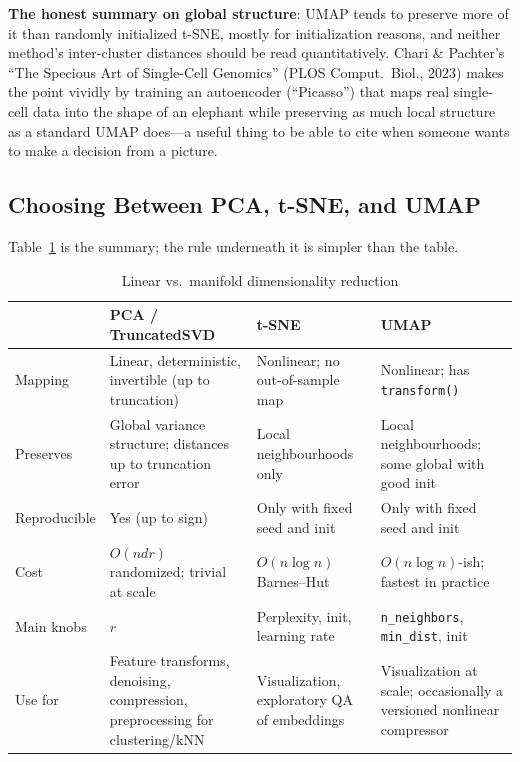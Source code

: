 \textbf{The honest summary on global structure}: UMAP tends to preserve more of it than randomly initialized t-SNE, mostly for initialization reasons, and neither method's inter-cluster distances should be read quantitatively. Chari \& Pachter's ``The Specious Art of Single-Cell Genomics'' (PLOS Comput.\ Biol., 2023) makes the point vividly by training an autoencoder (``Picasso'') that maps real single-cell data into the shape of an elephant while preserving as much local structure as a standard UMAP does---a useful thing to be able to cite when someone wants to make a decision from a picture.

\subsection{Choosing Between PCA, t-SNE, and UMAP}

Table~\ref{cml:tab:dimred_compare} is the summary; the rule underneath it is simpler than the table.

\begin{table}[H]
\centering
\small
\caption{Linear vs.\ manifold dimensionality reduction}
\label{cml:tab:dimred_compare}
\begin{tabularx}{\textwidth}{@{}l X X X@{}}
\toprule
 & \textbf{PCA / TruncatedSVD} & \textbf{t-SNE} & \textbf{UMAP} \\
\midrule
Mapping & Linear, deterministic, invertible (up to truncation) & Nonlinear; no out-of-sample map & Nonlinear; has \texttt{transform()} \\
Preserves & Global variance structure; distances up to truncation error & Local neighbourhoods only & Local neighbourhoods; some global with good init \\
Reproducible & Yes (up to sign) & Only with fixed seed and init & Only with fixed seed and init \\
Cost & $O(ndr)$ randomized; trivial at scale & $O(n\log n)$ Barnes--Hut & $O(n\log n)$-ish; fastest in practice \\
Main knobs & $r$ & Perplexity, init, learning rate & \texttt{n\_neighbors}, \texttt{min\_dist}, init \\
Use for & Feature transforms, denoising, compression, preprocessing for clustering/kNN & Visualization, exploratory QA of embeddings & Visualization at scale; occasionally a versioned nonlinear compressor \\
\bottomrule
\end{tabularx}
\end{table}

